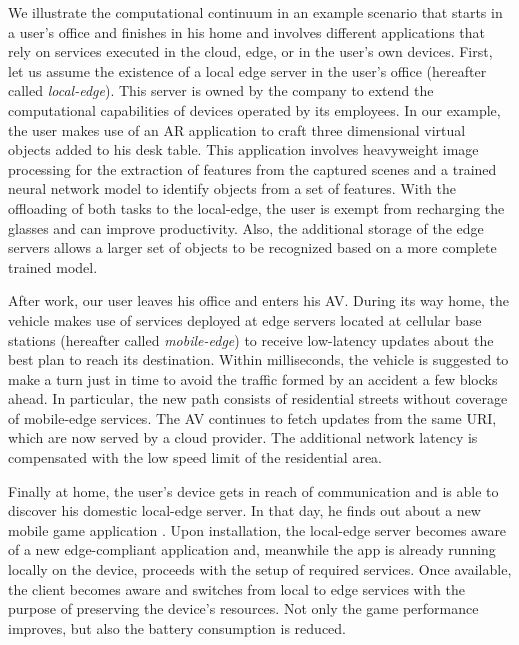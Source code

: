 We illustrate the computational continuum in an example scenario  that starts in a user's office and finishes in his home and involves different applications that rely on services executed in the cloud, edge, or in the user's own devices. 
First, let us assume the existence of a local edge server in the user's office (hereafter called \textit{local-edge}). This server is owned by the company to extend the computational capabilities of devices operated by its employees. In our example, the user makes use of an %
 AR application to craft three dimensional virtual objects added to his desk table. This application involves heavyweight image processing for the extraction of features from the captured scenes and a trained neural network model to identify objects from a set of features. With the offloading of both tasks to the local-edge, the user is exempt from recharging the glasses and can improve productivity. Also, the additional storage of the edge servers allows a larger set of objects to be recognized based on a more complete trained model.

After work, our user leaves his office and enters his AV. During its way home, the vehicle makes use of services deployed at edge servers located at cellular base stations (hereafter called \textit{mobile-edge}) to receive low-latency updates about the best plan to reach its destination. Within milliseconds, the vehicle is suggested to make a turn just in time to avoid the traffic formed by an accident a few blocks ahead. In particular, the new path consists of residential streets without coverage of mobile-edge services. The AV continues to fetch updates from the same URI, which are now served by a cloud provider. The additional network latency is compensated with the low speed limit of the residential area.

Finally at home, the user's device gets in reach of communication and is able to discover his domestic local-edge server. In that day, he finds out about a new mobile game application 
. Upon installation, the local-edge server becomes aware of a new edge-compliant application and, meanwhile the app is already running locally on the device, proceeds with the setup of required services. Once available, the client becomes aware and switches from local to edge services with the purpose of preserving the device's resources. Not only the game performance improves, but also the battery consumption is reduced.  

